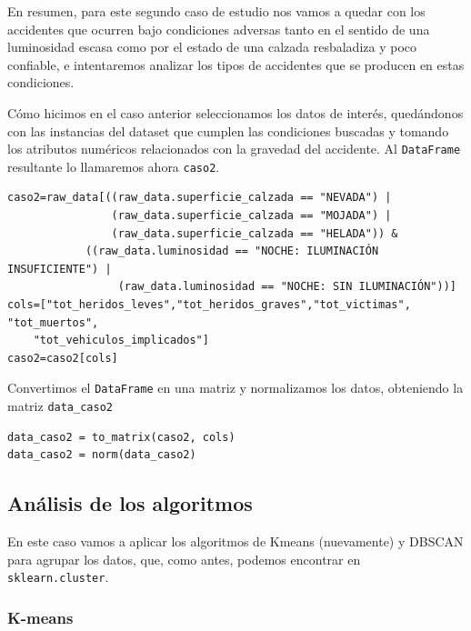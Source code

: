 \documentclass[a4paper,11pt]{book}
\begin{document}
En resumen, para este segundo caso de estudio nos vamos a quedar con los accidentes que ocurren bajo condiciones adversas tanto en el sentido de una luminosidad escasa como por el estado de una calzada resbaladiza y poco confiable, e intentaremos analizar los tipos de accidentes que se producen en estas condiciones.

Cómo hicimos en el caso anterior seleccionamos los datos de interés, quedándonos con las instancias del dataset que cumplen las condiciones buscadas y tomando los atributos numéricos relacionados con la gravedad del accidente. Al \texttt{DataFrame} resultante lo llamaremos ahora \texttt{caso2}.

\begin{verbatim}
caso2=raw_data[((raw_data.superficie_calzada == "NEVADA") | 
				(raw_data.superficie_calzada == "MOJADA") |
 				(raw_data.superficie_calzada == "HELADA")) &
 			((raw_data.luminosidad == "NOCHE: ILUMINACIÓN INSUFICIENTE") |
 				 (raw_data.luminosidad == "NOCHE: SIN ILUMINACIÓN"))]
cols=["tot_heridos_leves","tot_heridos_graves","tot_victimas", "tot_muertos",
	"tot_vehiculos_implicados"]
caso2=caso2[cols]

\end{verbatim}
Convertimos el \texttt{DataFrame} en una matriz y normalizamos los datos, obteniendo la matriz \texttt{data_caso2}
\begin{verbatim}
data_caso2 = to_matrix(caso2, cols)
data_caso2 = norm(data_caso2)
\end{verbatim}

\subsection{Análisis de los algoritmos}
En este caso vamos a aplicar los algoritmos de Kmeans (nuevamente) y DBSCAN para agrupar los datos, que, como antes, podemos encontrar en \texttt{sklearn.cluster}.
\subsubsection{K-means}
\end{document}
